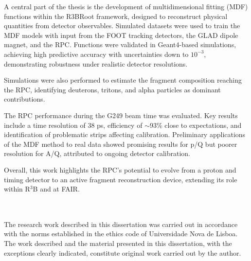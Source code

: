 A central part of the thesis is the development of multidimensional fitting (MDF) functions within the R3BRoot framework, designed to reconstruct physical quantities from detector observables. Simulated datasets were used to train the MDF models with input from the FOOT tracking detectors, the GLAD dipole magnet, and the RPC. Functions were validated in Geant4-based simulations, achieving high predictive accuracy with uncertainties down to $10^{-3}$, demonstrating robustness under realistic detector resolutions.

Simulations were also performed to estimate the fragment composition reaching the RPC, identifying deuterons, tritons, and alpha particles as dominant contributions.

The RPC performance during the G249 beam time was evaluated. Key results include a time resolution of 38 ps, efficiency of $\sim$93\% close to expectations, and identification of problematic strips affecting calibration. Preliminary applications of the MDF method to real data showed promising results for p/Q but poorer resolution for A/Q, attributed to ongoing detector calibration.

Overall, this work highlights the RPC’s potential to evolve from a proton and timing detector to an active fragment reconstruction device, extending its role within R$^3$B and at FAIR.

\\
\\
The research work described in this dissertation was carried out in accordance with the
norms established in the ethics code of Universidade Nova de Lisboa. The work described and
the material presented in this dissertation, with the exceptions clearly indicated, constitute
original work carried out by the author.
